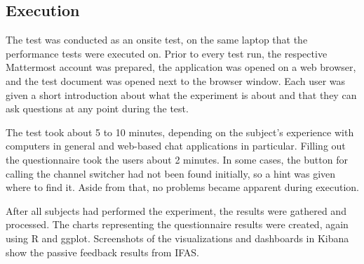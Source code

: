 %
%
%
%
%
%


\subsection{Execution}

The test was conducted as an onsite test, on the same laptop that the performance tests were executed on.
Prior to every test run, the respective Mattermost account was prepared, the application was opened on a web browser, and the test document was opened next to the browser window.
Each user was given a short introduction about what the experiment is about and that they can ask questions at any point during the test.

The test took about 5 to 10 minutes, depending on the subject's experience with computers in general and web-based chat applications in particular.
Filling out the questionnaire took the users about 2 minutes.
In some cases, the button for calling the channel switcher had not been found initially, so a hint was given where to find it.
Aside from that, no problems became apparent during execution.

After all subjects had performed the experiment, the results were gathered and processed.
The charts representing the questionnaire results were created, again using R and ggplot.
Screenshots of the visualizations and dashboards in Kibana show the passive feedback results from \ac{IFAS}.

